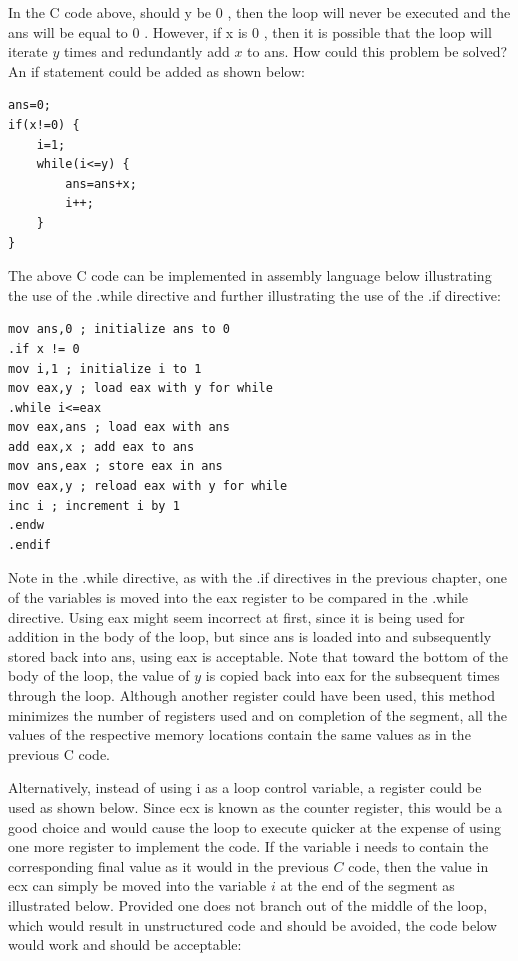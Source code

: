 \documentclass[10pt]{book}
\begin{document}
In the C code above, should y be 0 , then the loop will never be executed and the ans will be equal to 0 . However, if x is 0 , then it is possible that the loop will iterate $y$ times and redundantly add $x$ to ans. How could this problem be solved? An if statement could be added as shown below:


\begin{verbatim}
ans=0;
if(x!=0) {
    i=1;
    while(i<=y) {
        ans=ans+x;
        i++;
    }
}
\end{verbatim}

The above C code can be implemented in assembly language below illustrating the use of the .while directive and further illustrating the use of the .if directive:

\begin{verbatim}
mov ans,0 ; initialize ans to 0
.if x != 0
mov i,1 ; initialize i to 1
mov eax,y ; load eax with y for while
.while i<=eax
mov eax,ans ; load eax with ans
add eax,x ; add eax to ans
mov ans,eax ; store eax in ans
mov eax,y ; reload eax with y for while
inc i ; increment i by 1
.endw
.endif
\end{verbatim}

Note in the .while directive, as with the .if directives in the previous chapter, one of the variables is moved into the eax register to be compared in the .while directive. Using eax might seem incorrect at first, since it is being used for addition in the body of the loop, but since ans is loaded into and subsequently stored back into ans, using eax is acceptable. Note that toward the bottom of the body of the loop, the value of $y$ is copied back into eax for the subsequent times through the loop. Although another register could have been used, this method minimizes the number of registers used and on completion of the segment, all the\\
values of the respective memory locations contain the same values as in the previous C code.


Alternatively, instead of using i as a loop control variable, a register could be used as shown below. Since ecx is known as the counter register, this would be a good choice and would cause the loop to execute quicker at the expense of using one more register to implement the code. If the variable i needs to contain the corresponding final value as it would in the previous $C$ code, then the value in ecx can simply be moved into the variable $i$ at the end of the segment as illustrated below. Provided one does not branch out of the middle of the loop, which would result in unstructured code and should be avoided, the code below would work and should be acceptable:
\end{document}
